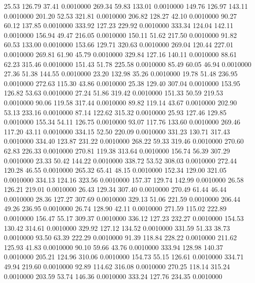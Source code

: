   25.53  126.79   37.41   0.0010000
 269.34   59.83  133.01   0.0010000
 149.76  126.97  143.11   0.0010000
 201.20   52.53  321.81   0.0010000
 206.82  128.27   42.10   0.0010000
  90.27   60.12  137.85   0.0010000
 333.92  127.23  229.92   0.0010000
 333.34  124.04  142.11   0.0010000
 156.94   49.47  216.05   0.0010000
 150.11   51.62  217.50   0.0010000
  91.82   60.53  133.00   0.0010000
 153.66  129.71  320.63   0.0010000
 269.04  120.44  227.01   0.0010000
 269.81   61.90   45.79   0.0010000
 329.84  127.16  140.11   0.0010000
  88.61   62.23  315.46   0.0010000
 151.43   51.78  225.58   0.0010000
  85.49   60.05   46.94   0.0010000
  27.36   51.38  144.55   0.0010000
  23.20  132.98   35.26   0.0010000
  19.78   51.48  236.95   0.0010000
 272.63  115.30   43.86   0.0010000
  25.38  129.40  307.04   0.0010000
 153.95  126.82   53.63   0.0010000
  27.24   51.86  319.42   0.0010000
 151.33   50.59  219.53   0.0010000
  90.06  119.58  317.44   0.0010000
  89.82  119.14   43.67   0.0010000
 202.90   53.13  233.16   0.0010000
  87.14  122.62  315.32   0.0010000
  25.93  127.46  129.85   0.0010000
 155.34   54.11  126.75   0.0010000
  93.07  117.76  133.60   0.0010000
 269.46  117.20   43.11   0.0010000
 334.15   52.50  220.09   0.0010000
 331.23  130.71  317.43   0.0010000
 334.40  123.87  231.22   0.0010000
 268.22   59.33  319.46   0.0010000
 270.60   62.83  226.33   0.0010000
 270.81  119.38  313.64   0.0010000
 156.74   56.39  307.29   0.0010000
  23.33   50.42  144.22   0.0010000
 338.72   53.52  308.03   0.0010000
 272.44  120.28   46.55   0.0010000
 265.32   65.41   48.15   0.0010000
 152.34  129.00  321.05   0.0010000
 334.13  124.16  323.56   0.0010000
 157.37  129.74  142.99   0.0010000
  26.58  126.21  219.01   0.0010000
  26.43  129.34  307.40   0.0010000
 270.49   61.44   46.44   0.0010000
  28.36  127.27  307.69   0.0010000
 329.13   51.06  221.59   0.0010000
 206.44   49.26  236.95   0.0010000
  26.74  128.90   42.11   0.0010000
 271.59  115.02  222.89   0.0010000
 156.47   55.17  309.37   0.0010000
 336.12  127.23  232.27   0.0010000
 154.53  130.42  314.61   0.0010000
 329.92  127.12  134.52   0.0010000
 331.59   51.33   38.73   0.0010000
  93.50   63.39  222.29   0.0010000
  91.39  118.84  228.22   0.0010000
 211.62  125.93   41.83   0.0010000
  90.10   59.66   43.76   0.0010000
 333.94  128.98  140.37   0.0010000
 205.21  124.96  310.06   0.0010000
 154.73   55.15  126.61   0.0010000
 334.71   49.94  219.60   0.0010000
  92.89  114.62  316.08   0.0010000
 270.25  118.14  315.24   0.0010000
 203.59   53.74  146.36   0.0010000
 333.24  127.76  234.35   0.0010000
